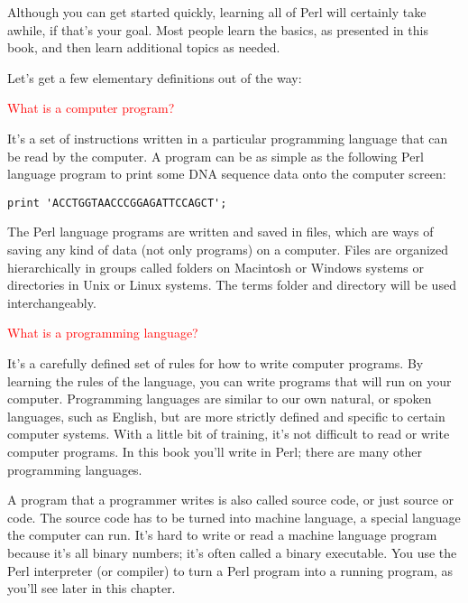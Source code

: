Although you can get started quickly, learning all of Perl will certainly take awhile, if that's your goal. Most people learn the basics, as presented in this book, and then learn additional topics as needed.

Let's get a few elementary definitions out of the way:

\textcolor{red}{What is a computer program?}

\begin{adjustwidth}{2em}{}
It's a set of instructions written in a particular programming language that can be read by the computer. A program can be as simple as the following Perl language program to print some DNA sequence data onto the computer screen:

\begin{lstlisting}
print 'ACCTGGTAACCCGGAGATTCCAGCT';
\end{lstlisting}

The Perl language programs are written and saved in files, which are ways of saving any kind of data (not only programs) on a computer. Files are organized hierarchically in groups called folders on Macintosh or Windows systems or directories in Unix or Linux systems. The terms folder and directory will be used interchangeably.
\end{adjustwidth}

\textcolor{red}{What is a programming language?}

\begin{adjustwidth}{2em}{}
It's a carefully defined set of rules for how to write computer programs. By learning the rules of the language, you can write programs that will run on your computer. Programming languages are similar to our own natural, or spoken languages, such as English, but are more strictly defined and specific to certain computer systems. With a little bit of training, it's not difficult to read or write computer programs. In this book you'll write in Perl; there are many other programming languages.

A program that a programmer writes is also called source code, or just source or code. The source code has to be turned into machine language, a special language the computer can run. It's hard to write or read a machine language program because it's all binary numbers; it's often called a binary executable. You use the Perl interpreter (or compiler) to turn a Perl program into a running program, as you'll see later in this chapter.
\end{adjustwidth}

